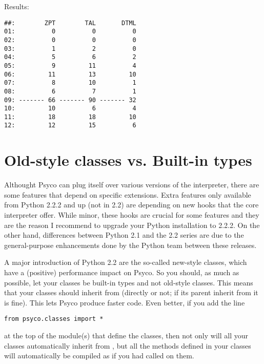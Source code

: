 \documentclass{manual}
\begin{document}
Results:

\begin{verbatim}
##:        ZPT        TAL       DTML
01:          0          0          0
02:          0          0          0
03:          1          2          0
04:          5          6          2
05:          9         11          4
06:         11         13         10
07:          8         10          1
08:          6          7          1
09: ------- 66 ------- 90 ------- 32
10:         10          6          4
11:         18         18         10
12:         12         15          6
\end{verbatim}


\section{Old-style classes vs. Built-in types}\label{metaclass}

Althought Psyco can plug itself over various versions of the interpreter, there are some features that depend on specific extensions.  Extra features only available from Python 2.2.2 and up (not in 2.2) are depending on new hooks that the core interpreter offer.  While minor, these hooks are crucial for some features and they are the reason I recommend to upgrade your Python installation to 2.2.2.  On the other hand, differences between Python 2.1 and the 2.2 series are due to the general-purpose enhancements done by the Python team between these releases.

A major introduction of Python 2.2 are the so-called new-style classes, which have a (positive) performance impact on Psyco.  So  you should, as much as possible, let your classes be built-in types and not old-style classes.  This means that your classes should inherit from  (directly or not; if its parent inherit from  it is fine).  This lets Psyco produce faster code.  Even better, if you add the line

\begin{verbatim}
from psyco.classes import *
\end{verbatim}

at the top of the module(s) that define the classes, then not only will all your classes automatically inherit from , but all the methods defined in your classes will automatically be compiled as if you had called  on them.

\end{document}
